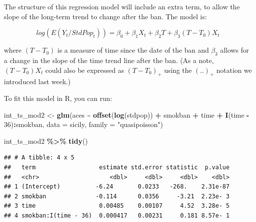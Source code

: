 \documentclass[
]{book}
\newenvironment{Shaded}{\begin{snugshade}}{\end{snugshade}}
\newcommand{\AttributeTok}[1]{\textcolor[rgb]{0.13,0.29,0.53}{#1}}
\newcommand{\DecValTok}[1]{\textcolor[rgb]{0.00,0.00,0.81}{#1}}
\newcommand{\FunctionTok}[1]{\textcolor[rgb]{0.13,0.29,0.53}{\textbf{#1}}}
\newcommand{\NormalTok}[1]{#1}
\newcommand{\OtherTok}[1]{\textcolor[rgb]{0.56,0.35,0.01}{#1}}
\newcommand{\SpecialCharTok}[1]{\textcolor[rgb]{0.81,0.36,0.00}{\textbf{#1}}}
\newcommand{\StringTok}[1]{\textcolor[rgb]{0.31,0.60,0.02}{#1}}
\begin{document}
The structure of this regression model will include an extra term, to allow the slope of the long-term trend to change after the ban. The model is:

\[
log(E(Y_t/StdPop_t)) = \beta_0 + \beta_1 X_t + \beta_2 T + \beta_3 (T-T_0)X_t
\]

where \((T-T_0)\) is a measure of time since the date of the ban and \(\beta_3\) allows for a change in the slope of the time trend line after the ban. (As a note, \((T-T_0)X_t\) could also be expressed as \((T-T_0)_+\) using the \((..)_+\) notation we introduced last week.)

To fit this model in R, you can run:

\begin{Shaded}
\begin{Highlighting}[]
\NormalTok{int\_ts\_mod2 }\OtherTok{\textless{}{-}} \FunctionTok{glm}\NormalTok{(aces }\SpecialCharTok{\textasciitilde{}} \FunctionTok{offset}\NormalTok{(}\FunctionTok{log}\NormalTok{(stdpop)) }\SpecialCharTok{+}\NormalTok{ smokban }\SpecialCharTok{+}\NormalTok{ time }\SpecialCharTok{+} 
                     \FunctionTok{I}\NormalTok{(time }\SpecialCharTok{{-}} \DecValTok{36}\NormalTok{)}\SpecialCharTok{:}\NormalTok{smokban, }
                      \AttributeTok{data =}\NormalTok{ sicily, }
                      \AttributeTok{family =} \StringTok{"quasipoisson"}\NormalTok{)}
\end{Highlighting}
\end{Shaded}

\begin{Shaded}
\begin{Highlighting}[]
\NormalTok{int\_ts\_mod2 }\SpecialCharTok{\%\textgreater{}\%} 
  \FunctionTok{tidy}\NormalTok{()}
\end{Highlighting}
\end{Shaded}

\begin{verbatim}
## # A tibble: 4 x 5
##   term                  estimate std.error statistic  p.value
##   <chr>                    <dbl>     <dbl>     <dbl>    <dbl>
## 1 (Intercept)          -6.24       0.0233   -268.    2.31e-87
## 2 smokban              -0.114      0.0356     -3.21  2.23e- 3
## 3 time                  0.00485    0.00107     4.52  3.28e- 5
## 4 smokban:I(time - 36)  0.000417   0.00231     0.181 8.57e- 1
\end{verbatim}
\end{document}
